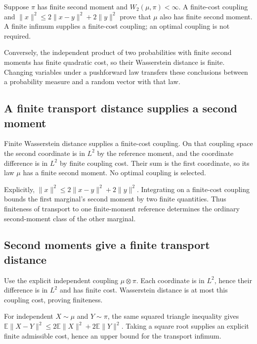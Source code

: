 \documentclass[11pt,a4paper]{article}
\begin{document}
Suppose \(\pi\) has finite second moment and \(W_2(\mu,\pi)<\infty\). A finite-cost coupling and \(\|x\|^2\le2\|x-y\|^2+2\|y\|^2\) prove that \(\mu\) also has finite second moment. A finite infimum supplies a finite-cost coupling; an optimal coupling is not required.



Conversely, the independent product of two probabilities with finite second moments has finite quadratic cost, so their Wasserstein distance is finite. Changing variables under a pushforward law transfers these conclusions between a probability measure and a random vector with that law.


\subsection{\texorpdfstring{A finite transport distance supplies a second moment}{A finite transport distance supplies a second moment}}


Finite Wasserstein distance supplies a finite-cost coupling. On that coupling space the second coordinate is in \(L^2\) by the reference moment, and the coordinate difference is in \(L^2\) by finite coupling cost. Their sum is the first coordinate, so its law \(\mu\) has a finite second moment. No optimal coupling is selected.



Explicitly, \(\|x\|^2\le2\|x-y\|^2+2\|y\|^2\). Integrating on a finite-cost coupling bounds the first marginal's second moment by two finite quantities. Thus finiteness of transport to one finite-moment reference determines the ordinary second-moment class of the other marginal.


\subsection{\texorpdfstring{Second moments give a finite transport distance}{Second moments give a finite transport distance}}


Use the explicit independent coupling \(\mu\otimes\pi\). Each coordinate is in \(L^2\), hence their difference is in \(L^2\) and has finite cost. Wasserstein distance is at most this coupling cost, proving finiteness.



For independent \(X\sim\mu\) and \(Y\sim\pi\), the same squared triangle inequality gives \(\mathbb E\|X-Y\|^2\le2\mathbb E\|X\|^2+2\mathbb E\|Y\|^2\). Taking a square root supplies an explicit finite admissible cost, hence an upper bound for the transport infimum.
\end{document}
